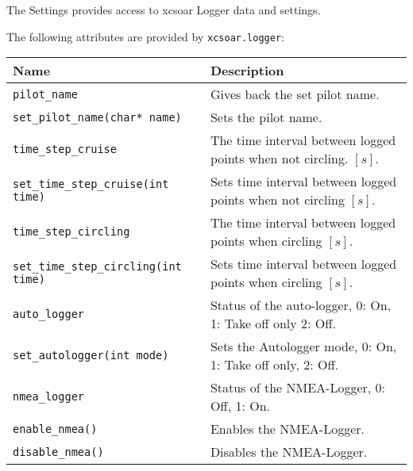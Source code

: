 The Settings provides access to xcsoar Logger data and settings.

The following attributes are provided by \verb|xcsoar.logger|:

\begin{maxipage}
\begin{tabularx}{1.9\textwidth}{l|X}
Name & Description \\
\hline\hline

\verb|pilot_name| & Gives back the set pilot name.\\

\hline

\verb|set_pilot_name(char* name)| &  Sets the pilot name.\\

\hline

\verb|time_step_cruise| & The time interval between logged 
points when not circling. $[s]$.\\

\hline

\verb|set_time_step_cruise(int time)| &  Sets time interval between logged 
points when not circling $[s]$.\\

\hline

\verb|time_step_circling| &  The time interval between logged 
points when circling $[s]$.\\

\hline

\verb|set_time_step_circling(int time)| &  Sets time interval between logged 
points when circling $[s]$.\\

\hline

\verb|auto_logger| &  Status of the auto-logger, 0: On, 1: Take off only
2: Off.\\

\hline

\verb|set_autologger(int mode)| &  Sets the Autologger mode, 0: On,
1: Take off only, 2: Off.\\

\hline

\verb|nmea_logger| &  Status of the NMEA-Logger, 0: Off, 1: On.\\

\hline

\verb|enable_nmea()| &  Enables the NMEA-Logger.\\

\hline

\verb|disable_nmea()| &  Disables the NMEA-Logger.\\


\end{tabularx}
\end{maxipage}
